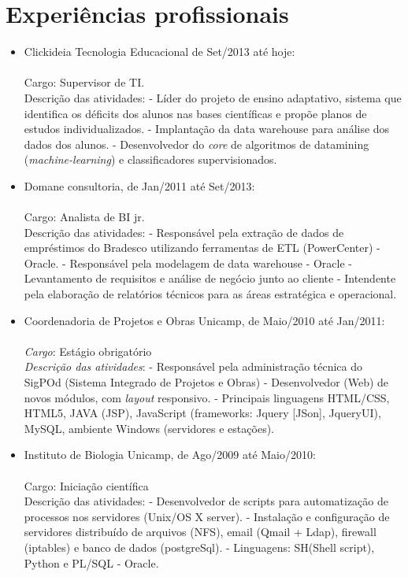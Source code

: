 \documentclass[a4paper,11pt]{article}
\begin{document}
\section{Experiências profissionais}
\begin{itemize}

\item Clickideia Tecnologia Educacional de Set/2013 até hoje:\\
{\small \\ 
  {Cargo}: Supervisor  de TI.\\
  {Descrição das atividades}: 
  \subitem - Líder do projeto de ensino adaptativo, sistema que identifica os déficits dos alunos nas bases científicas e propõe planos de estudos individualizados.
  \subitem - Implantação da data warehouse para análise dos dados dos alunos.
  \subitem - Desenvolvedor do \textit{core} de algoritmos de datamining (\textit{machine-learning}) e classificadores supervisionados.\\
}
\item {Domane consultoria, de Jan/2011 até Set/2013}: \\
{\small \\
  {Cargo}: Analista de BI jr.\\
  {Descrição das atividades}: 
  \subitem - Responsável pela extração de dados de empréstimos do Bradesco utilizando ferramentas de ETL (PowerCenter) - Oracle.
  \subitem - Responsável pela modelagem de data warehouse - Oracle
  \subitem - Levantamento de requisitos e análise de negócio junto ao cliente
  \subitem - Intendente pela elaboração de relatórios técnicos para as áreas estratégica e operacional.\\
}
\item {Coordenadoria de Projetos e Obras Unicamp, de Maio/2010 até Jan/2011}:\\
{\small \\  
  \emph{Cargo}: Estágio obrigatório\\
  \emph{Descrição das atividades}: 
  \subitem - Responsável pela administração técnica do SigPOd (Sistema Integrado de Projetos e Obras)
  \subitem - Desenvolvedor (Web) de novos módulos, com \textit{layout} responsivo.
  \subitem - Principais linguagens {HTML/CSS, HTML5, JAVA (JSP), JavaScript (frameworks: Jquery [JSon], JqueryUI), MySQL}, ambiente Windows (servidores e estações).
}  
\item {Instituto de Biologia Unicamp, de Ago/2009 até Maio/2010}: \\
  {\small \\ 
  {Cargo}: Iniciação científica\\
  {Descrição das atividades}: 
  \subitem - Desenvolvedor de scripts para automatização de processos nos servidores (Unix/OS X server).
  \subitem - Instalação e configuração de servidores distribuído de arquivos (NFS), email (Qmail + Ldap), firewall (iptables) e banco de dados (postgreSql).
  \subitem - Linguagens: SH(Shell script), Python e PL/SQL - Oracle.\\
}


\end{itemize}
\end{document}
